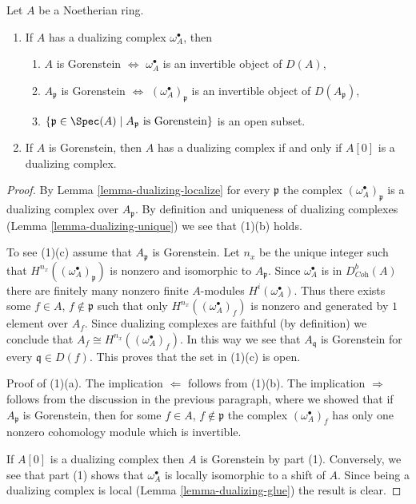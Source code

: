 \begin{lemma}
\label{lemma-gorenstein}
Let $A$ be a Noetherian ring.
\begin{enumerate}
\item If $A$ has a dualizing complex $\omega_A^\bullet$, then
\begin{enumerate}
\item $A$ is Gorenstein $\Leftrightarrow$ $\omega_A^\bullet$ is an invertible
object of $D(A)$,
\item $A_\mathfrak p$ is Gorenstein $\Leftrightarrow$
$(\omega_A^\bullet)_\mathfrak p$ is an invertible object of
$D(A_\mathfrak p)$,
\item $\{\mathfrak p \in \Spec(A) \mid A_\mathfrak p\text{ is Gorenstein}\}$
is an open subset.
\end{enumerate}
\item If $A$ is Gorenstein, then $A$ has a dualizing complex if and
only if $A[0]$ is a dualizing complex.
\end{enumerate}
\end{lemma}

\begin{proof}
By Lemma \ref{lemma-dualizing-localize} for every
$\mathfrak p$ the complex $(\omega_A^\bullet)_\mathfrak p$ is a
dualizing complex over $A_\mathfrak p$. By definition and uniqueness
of dualizing complexes (Lemma \ref{lemma-dualizing-unique})
we see that (1)(b) holds.

\medskip\noindent
To see (1)(c) assume that $A_\mathfrak p$ is Gorenstein.
Let $n_x$ be the unique integer such that
$H^{n_{x}}((\omega_A^\bullet)_\mathfrak p)$
is nonzero and isomorphic to $A_\mathfrak p$.
Since $\omega_A^\bullet$ is in $D^b_{\textit{Coh}}(A)$
there are finitely many nonzero finite $A$-modules
$H^i(\omega_A^\bullet)$. Thus there exists some
$f \in A$, $f \not \in \mathfrak p$
such that only $H^{n_x}((\omega_A^\bullet)_f)$
is nonzero and generated by $1$ element over $A_f$.
Since dualizing complexes are faithful (by definition)
we conclude that $A_f \cong H^{n_x}((\omega_A^\bullet)_f)$.
In this way we see that $A_\mathfrak q$ is Gorenstein
for every $\mathfrak q \in D(f)$. This proves that the set
in (1)(c) is open.

\medskip\noindent
Proof of (1)(a). The implication $\Leftarrow$ follows from (1)(b).
The implication $\Rightarrow$ follows from the discussion
in the previous paragraph, where we showed that if $A_\mathfrak p$
is Gorenstein, then for some $f \in A$, $f \not \in \mathfrak p$
the complex $(\omega_A^\bullet)_f$ has only one nonzero cohomology module
which is invertible.

\medskip\noindent
If $A[0]$ is a dualizing complex then $A$ is Gorenstein by
part (1). Conversely, we see that part (1) shows that
$\omega_A^\bullet$ is locally isomorphic to a shift of $A$.
Since being a dualizing complex is local
(Lemma \ref{lemma-dualizing-glue})
the result is clear.
\end{proof}

